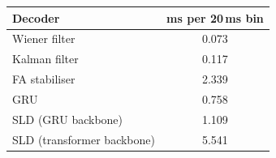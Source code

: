 \begin{tabular}{lc}
\toprule
Decoder & ms per 20\,ms bin \\
\midrule
Wiener filter & 0.073 \\
Kalman filter & 0.117 \\
FA stabiliser & 2.339 \\
GRU & 0.758 \\
SLD (GRU backbone) & 1.109 \\
SLD (transformer backbone) & 5.541 \\
\bottomrule
\end{tabular}
